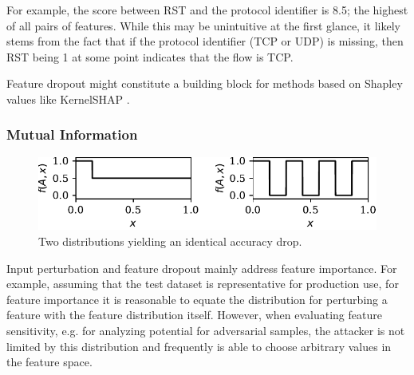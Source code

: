\documentclass[conference]{IEEEtran}
\begin{document}
For example, the score between RST and the protocol identifier is 8.5; the highest of all pairs of features. While this may be unintuitive at the first glance, it likely stems from the fact that if the protocol identifier (TCP or UDP) is missing, then 
RST being 1 at some point indicates that the flow is TCP.

Feature dropout might constitute a building block for methods based on Shapley values \cite{shapley_value_1953} like KernelSHAP \cite{lundberg_unified_2017}. 
\subsubsection{Mutual Information}
\begin{figure}
\includegraphics[width=\columnwidth]{../plots/mutinfo_example.pdf}
\caption{Two distributions yielding an identical accuracy drop.}
\label{fig:mutinfo_example}
\end{figure}
Input perturbation and feature dropout mainly address feature importance.
For example, assuming that the test dataset is representative for production use, for feature importance it is reasonable to equate the distribution for perturbing a feature with the feature distribution itself. However, when evaluating feature sensitivity, e.g. for analyzing potential for adversarial samples, the attacker is not limited by this distribution and frequently is able to choose arbitrary values in the feature space.
\end{document}
